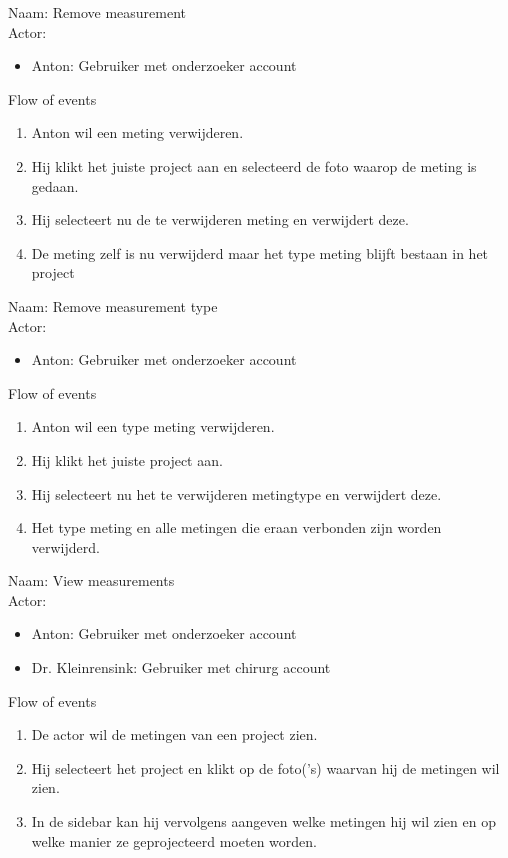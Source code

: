 \item   Naam: Remove measurement  \\
	Actor:
	\begin{itemize}
		\item Anton: Gebruiker met onderzoeker account
	\end{itemize}
	Flow of events
	\begin{enumerate}
		\item Anton wil een meting verwijderen.
		\item Hij klikt het juiste project aan en selecteerd de foto waarop de meting is gedaan.
		\item Hij selecteert nu de te verwijderen meting en verwijdert deze.
		\item De meting zelf is nu verwijderd maar het type meting blijft bestaan in het project
	\end{enumerate}


\item   Naam: Remove measurement type  \\
	Actor:
	\begin{itemize}
		\item Anton: Gebruiker met onderzoeker account
	\end{itemize}
	Flow of events
	\begin{enumerate}
		\item Anton wil een type meting verwijderen.
		\item Hij klikt het juiste project aan.
		\item Hij selecteert nu het te verwijderen metingtype en verwijdert deze.
		\item Het type meting en alle metingen die eraan verbonden zijn worden verwijderd.
	\end{enumerate}


\item   Naam: View measurements \\
	Actor:
	\begin{itemize}
		\item Anton: Gebruiker met onderzoeker account
		\item Dr. Kleinrensink: Gebruiker met chirurg account
	\end{itemize}
	Flow of events
	\begin{enumerate}
		\item De actor wil de metingen van een project zien.
		\item Hij selecteert het project en klikt op de foto('s) waarvan hij de metingen wil zien.
		\item In de sidebar kan hij vervolgens aangeven welke metingen hij wil zien en op welke manier ze geprojecteerd moeten worden.
	\end{enumerate}



